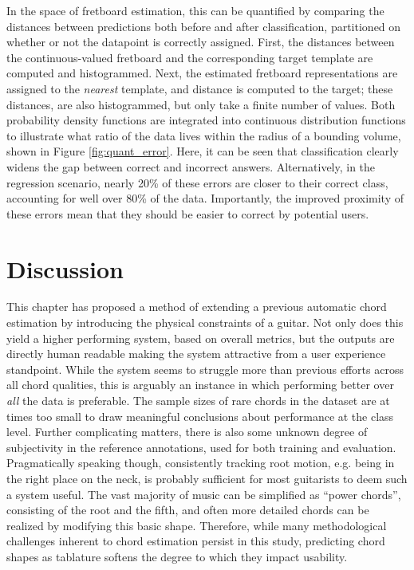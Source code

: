 In the space of fretboard estimation, this can be quantified by comparing the distances between predictions both before and after classification, partitioned on whether or not the datapoint is correctly assigned.
First, the distances between the continuous-valued fretboard and the corresponding target template are computed and histogrammed.
Next, the estimated fretboard representations are assigned to the \emph{nearest} template, and distance is computed to the target; these distances, are also histogrammed, but only take a finite number of values.
Both probability density functions are integrated into continuous distribution functions to illustrate what ratio of the data lives within the radius of a bounding volume, shown in Figure \ref{fig:quant_error}.
Here, it can be seen that classification clearly widens the gap between correct and incorrect answers.
Alternatively, in the regression scenario, nearly 20\% of these errors are closer to their correct class, accounting for well over 80\% of the data.
Importantly, the improved proximity of these errors mean that they should be easier to correct by potential users.


\section{Discussion}

This chapter has proposed a method of extending a previous automatic chord estimation by introducing the physical constraints of a guitar.
Not only does this yield a higher performing system, based on overall metrics, but the outputs are directly human readable making the system attractive from a user experience standpoint.
While the system seems to struggle more than previous efforts across all chord qualities, this is arguably an instance in which performing better over \emph{all} the data is preferable.
The sample sizes of rare chords in the dataset are at times too small to draw meaningful conclusions about performance at the class level.
Further complicating matters, there is also some unknown degree of subjectivity in the reference annotations, used for both training and evaluation.
Pragmatically speaking though, consistently tracking root motion, e.g. being in the right place on the neck, is probably sufficient for most guitarists to deem such a system useful.
The vast majority of music can be simplified as ``power chords'', consisting of the root and the fifth, and often more detailed chords can be realized by modifying this basic shape.
Therefore, while many methodological challenges inherent to chord estimation persist in this study, predicting chord shapes as tablature softens the degree to which they impact usability.


